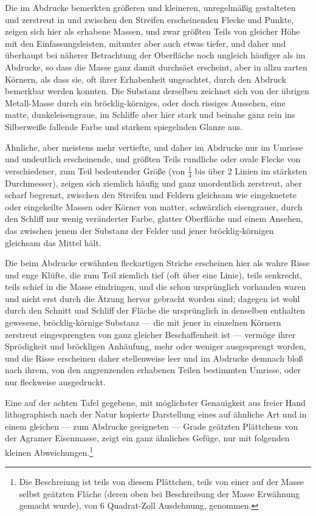 \documentclass[a4paper, 11pt, oneside, german]{article}
\begin{document}
Die im Abdrucke bemerkten größeren und kleineren, unregelmäßig gestalteten und zerstreut in und zwischen den Streifen erscheinenden Flecke und Punkte, zeigen sich hier als erhabene Massen, und zwar größten Teils von gleicher Höhe mit den Einfassungsleisten, mitunter aber auch etwas tiefer, und daher und überhaupt bei näherer Betrachtung der Oberfläche noch ungleich häufiger als im Abdrucke, so dass die Masse ganz damit durchsäet erscheint, aber in allzu zarten Körnern, als dass sie, oft ihrer Erhabenheit ungeachtet, durch den Abdruck bemerkbar werden konnten. Die Substanz derselben zeichnet sich von der übrigen Metall-Masse durch ein bröcklig-körniges, oder doch rissiges Aussehen, eine matte, dunkeleisengraue, im Schliffe aber hier stark und beinahe ganz rein ins Silberweiße fallende Farbe und starkem spiegelnden Glanze aus.

Ähnliche, aber meistens mehr vertiefte, und daher im Abdrucke nur im Umrisse und undeutlich erscheinende, und größten Teils rundliche oder ovale Flecke von verschiedener, zum Teil bedeutender Größe (von $\frac{1}{4}$ bis über 2 Linien im stärksten Durchmesser), zeigen sich ziemlich häufig und ganz unordentlich zerstreut, aber scharf begrenzt, zwischen den Streifen und Feldern gleichsam wie eingeknetete oder eingekeilte Massen oder Körner von matter, schwärzlich eisengrauer, durch den Schliff nur wenig veränderter Farbe, glatter Oberfläche und einem Ansehen, das zwischen jenem der Substanz der Felder und jener bröcklig-körnigen gleichsam das Mittel hält.

Die beim Abdrucke erwähnten fleckartigen Striche erscheinen hier als wahre Risse und enge Klüfte, die zum Teil ziemlich tief (oft über eine Linie), teils senkrecht, teils schief in die Masse eindringen, und die schon ursprünglich vorhanden waren und nicht erst durch die Ätzung hervor gebracht worden sind; dagegen ist wohl durch den Schnitt und Schliff der Fläche die ursprünglich in denselben enthalten gewesene, bröcklig-körnige Substanz --- die mit jener in einzelnen Körnern zerstreut eingesprengten von ganz gleicher Beschaffenheit ist --- vermöge ihrer Sprödigkeit und bröckligen Anhäufung, mehr oder weniger ausgesprengt worden, und die Risse erscheinen daher stellenweise leer und im Abdrucke demnach bloß nach ihrem, von den angrenzenden erhabenen Teilen bestimmten Umrisse, oder nur fleckweise ausgedruckt.

Eine auf der achten Tafel gegebene, mit möglichster Genauigkeit aus freier Hand lithographisch nach der Natur kopierte Darstellung eines auf ähnliche Art und in einem gleichen --- zum Abdrucke geeigneten --- Grade geätzten Plättchens von der Agramer Eisenmasse, zeigt ein ganz ähnliches Gefüge, nur mit folgenden kleinen Abweichungen.\footnote{Die Beschreiung ist teils von diesem Plättchen, teils von einer auf der Masse selbst geätzten Fläche (deren oben bei Beschreibung der Masse Erwähnung gemacht wurde), von 6 Quadrat-Zoll Ausdehnung, genommen.}
\end{document}
